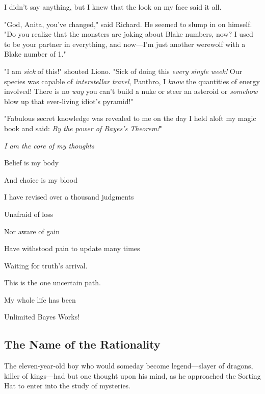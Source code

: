 I didn't say anything, but I knew that the look on my face said it all.

"God, Anita, you've changed," said Richard. He seemed to slump in on himself.
"Do you realize that the monsters are joking about Blake numbers, now? I used
to be your partner in everything, and now---I'm just another werewolf with a
Blake number of 1."
\sbreak%



\noindent{}"I am \emph{sick} of this!" shouted Liono. "Sick of doing this \emph{every
single week!} Our species was capable of \emph{interstellar travel}, Panthro, I
\emph{know} the quantities of energy involved! There is no \emph{way} you can't
build a nuke or steer an asteroid or \emph{somehow} blow up that ever-living
idiot's pyramid!"
\sbreak%
\vspace{-2\baselineskip}



"Fabulous secret knowledge was revealed to me on the day I held aloft my magic
book and said: \emph{By the power of Bayes's Theorem!}"
\sbreak%

\begin{center}
  { \em
    I am the core of my thoughts

    Belief is my body

    And choice is my blood

    I have revised over a thousand judgments

    Unafraid of loss

    Nor aware of gain

    Have withstood pain to update many times

    Waiting for truth's arrival.

    This is the one uncertain path.

    My whole life has been\el

    Unlimited Bayes Works!
  }
\end{center}
\sbreak%

\subsection{The Name of the Rationality}
The eleven-year-old boy who would someday become legend---slayer of dragons,
killer of kings---had but one thought upon his mind, as he approached the
Sorting Hat to enter into the study of mysteries.


